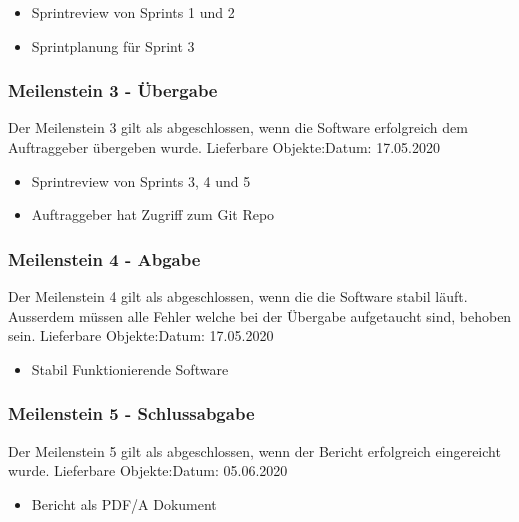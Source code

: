 \begin{itemize}
  \item Sprintreview von Sprints 1 und 2
  \item Sprintplanung für Sprint 3
  
\end{itemize}

\subsubsection{Meilenstein 3 - Übergabe}
Der Meilenstein 3 gilt als abgeschlossen, wenn die Software erfolgreich dem Auftraggeber übergeben wurde.\newline \newline
Lieferbare Objekte:\hfill Datum: 17.05.2020


\begin{itemize}
  \item Sprintreview von Sprints 3, 4 und 5 
  \item Auftraggeber hat Zugriff zum Git Repo
  
\end{itemize}

\subsubsection{Meilenstein 4 - Abgabe}
Der Meilenstein 4 gilt als abgeschlossen, wenn die die Software stabil läuft. Ausserdem müssen alle Fehler welche bei der Übergabe aufgetaucht sind, behoben sein.\newline \newline
Lieferbare Objekte:\hfill Datum: 17.05.2020


\begin{itemize}
  \item Stabil Funktionierende Software
\end{itemize}

\subsubsection{Meilenstein 5 - Schlussabgabe}
Der Meilenstein 5 gilt als abgeschlossen, wenn der Bericht erfolgreich eingereicht wurde.\newline \newline
Lieferbare Objekte:\hfill Datum: 05.06.2020

\begin{itemize}
  \item Bericht als PDF/A Dokument
\end{itemize}

